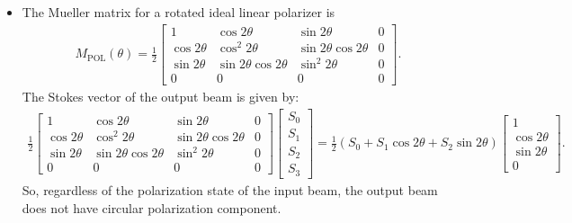 \documentclass[10pt]{article}
\begin{document}
\begin{itemize}
		\item The Mueller matrix for a rotated ideal linear polarizer is
		\begin{align*}
			M_{\mathrm{POL}}(\theta) = \frac{1}{2} \begin{bmatrix}
				1 & \cos 2\theta & \sin 2\theta & 0 \\
				\cos 2\theta & \cos^2 2\theta & \sin 2\theta \cos 2\theta & 0 \\
				\sin 2\theta & \sin 2\theta \cos 2\theta & \sin^2 2\theta & 0 \\
				0 & 0 & 0 & 0
			\end{bmatrix}.
		\end{align*}
		The Stokes vector of the output beam is given by:
		\begin{align*}
			\frac{1}{2} \begin{bmatrix}
				1 & \cos 2\theta & \sin 2\theta & 0 \\
				\cos 2\theta & \cos^2 2\theta & \sin 2\theta \cos 2\theta & 0 \\
				\sin 2\theta & \sin 2\theta \cos 2\theta & \sin^2 2\theta & 0 \\
				0 & 0 & 0 & 0
			\end{bmatrix}
			\begin{bmatrix}
				S_0 \\ S_1 \\ S_2 \\ S_3
			\end{bmatrix}
			= \frac{1}{2}(S_0 + S_1 \cos 2\theta + S_2 \sin 2\theta) \begin{bmatrix}
				1 \\ \cos 2\theta \\ \sin 2\theta \\ 0
			\end{bmatrix}.			
		\end{align*}
		So, regardless of the polarization state of the input beam, the output beam does not have circular polarization component.


\end{itemize}
\end{document}
